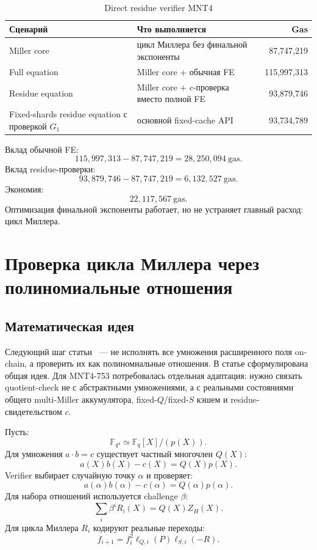 \documentclass[12pt,a4paper]{article}
\newcommand{\Fq}{\mathbb{F}_q}
\newcommand{\Gas}{\mathrm{gas}}
\begin{document}
\begin{table}[htbp]
\centering
\caption{Direct residue verifier MNT4}
\small
\begin{tabularx}{\linewidth}{Y Y r}
\toprule
Сценарий & Что выполняется & Gas \\
\midrule
Miller core & цикл Миллера без финальной экспоненты & 87,747,219 \\
Full equation & Miller core + обычная FE & 115,997,313 \\
Residue equation & Miller core + $c$-проверка вместо полной FE & 93,879,746 \\
Fixed-shards residue equation с проверкой $G_1$ & основной fixed-cache API & 93,734,789 \\
\bottomrule
\end{tabularx}
\end{table}

Вклад обычной FE:
\[
    115{,}997{,}313-87{,}747{,}219
    =28{,}250{,}094\ \Gas.
\]
Вклад residue-проверки:
\[
    93{,}879{,}746-87{,}747{,}219
    =6{,}132{,}527\ \Gas.
\]
Экономия:
\[
    22{,}117{,}567\ \Gas.
\]
Оптимизация финальной экспоненты работает, но не устраняет главный расход:
цикл Миллера.

\section{Проверка цикла Миллера через полиномиальные отношения}

\subsection{Математическая идея}

Следующий шаг статьи~\cite{eprint640} --- не исполнять все умножения
расширенного поля on-chain, а проверить их как полиномиальные отношения.
В статье сформулирована общая идея. Для MNT4-753 потребовалась отдельная
адаптация: нужно связать quotient-check не с абстрактными умножениями, а с
реальными состояниями общего multi-Miller аккумулятора, fixed-$Q$/fixed-$S$
кэшем и residue-свидетельством $c$.

Пусть:
\[
    \mathbb{F}_{q^4}\simeq \Fq[X]/(p(X)).
\]
Для умножения $a\cdot b=c$ существует частный многочлен $Q(X)$:
\[
    a(X)b(X)-c(X)=Q(X)p(X).
\]
Verifier выбирает случайную точку $\alpha$ и проверяет:
\[
    a(\alpha)b(\alpha)-c(\alpha)=Q(\alpha)p(\alpha).
\]
Для набора отношений используется challenge $\beta$:
\[
    \sum_i\beta^i R_i(X)=Q(X)Z_H(X).
\]
Для цикла Миллера $R_i$ кодируют реальные переходы:
\[
    f_{i+1}=f_i^2\ell_{Q,i}(P)\ell_{S,i}(-R).
\]
\end{document}
